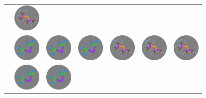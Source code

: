 \documentclass[
  letterpaper,
  DIV=11,
  numbers=noendperiod,
  oneside]{scrreprt}
\begin{document}
\begin{longtable}[]{@{}lllllll@{}}
&
\includegraphics[width=\linewidth,height=0.52083in,keepaspectratio]{images/fractal-high.png} \\
&
\includegraphics[width=\linewidth,height=0.52083in,keepaspectratio]{images/fractal-low.png}
&
\includegraphics[width=\linewidth,height=0.52083in,keepaspectratio]{images/fractal-low.png}
&
\includegraphics[width=\linewidth,height=0.52083in,keepaspectratio]{images/fractal-low.png}
&
\includegraphics[width=\linewidth,height=0.52083in,keepaspectratio]{images/fractal-high.png}
&
\includegraphics[width=\linewidth,height=0.52083in,keepaspectratio]{images/fractal-high.png}
&
\includegraphics[width=\linewidth,height=0.52083in,keepaspectratio]{images/fractal-high.png} \\
&
\includegraphics[width=\linewidth,height=0.52083in,keepaspectratio]{images/fractal-low.png}
&
\includegraphics[width=\linewidth,height=0.52083in,keepaspectratio]{images/fractal-low.png}

\end{longtable}
\end{document}

